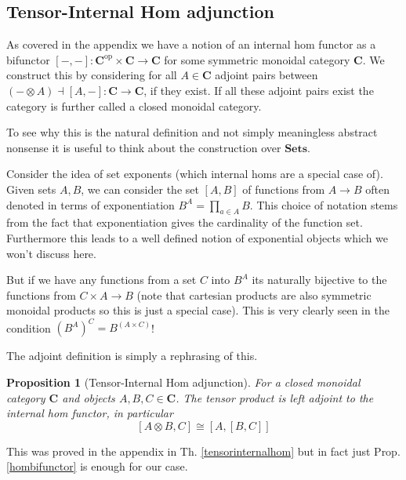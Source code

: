 \documentclass[12pt]{article}
\numberwithin{equation}{section}
\newtheorem{proposition}{Proposition}[section]
\begin{document}
	
	\subsection{Tensor-Internal Hom adjunction}
	As covered in the appendix we have a notion of an internal hom functor as a bifunctor $[-,-]:  \mathbf{C}^\mathrm{op} \times \mathbf{C} \to \mathbf{C}$ for some symmetric monoidal category $\mathbf{C}$. We construct this by considering for all $A \in \mathbf{C}$ adjoint pairs between $(-\otimes A) \dashv [A,-]: \mathbf{C}\to \mathbf{C}$, if they exist. If all these adjoint pairs exist the category is further called a closed monoidal category. 
	
	To see why this is the natural definition and not simply meaningless abstract nonsense it is useful to think about the construction over $\mathbf{Sets}$. 
	
	Consider the idea of set exponents (which internal homs are a special case of). Given sets $A, B$, we can consider the set $[A,B]$ of functions from $A \to B$ often denoted in terms of exponentiation $B^A= \prod_{a \in A} B$. This choice of notation stems from the fact that exponentiation gives the cardinality of the function set. Furthermore this leads to a well defined notion of exponential objects which we won't discuss here.
	
	But if we have any functions from a set $C$ into $B^A$ its naturally bijective to the functions from $C \times A \to B$ (note that cartesian products are also symmetric monoidal products so this is just a special case). This is very clearly seen in the condition $(B^A)^C=B^{(A\times C)} $! 
	
	The adjoint definition is simply a rephrasing of this.
	

	
	\begin{proposition}[Tensor-Internal Hom adjunction]
		For a closed monoidal category $\mathbf C$ and objects $A,B,C \in \mathbf{C}$. The tensor product is left adjoint to the internal hom functor, in particular
		\[ [A\otimes B,C ] \cong [A, [B,C]] \]
	\end{proposition}
	This was proved in the appendix in Th. \ref{tensorinternalhom} but in fact just Prop. \ref{hombifunctor} is enough for our case.
	
\end{document}
